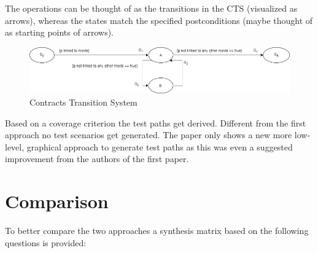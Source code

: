 The operations can be thought of as the transitions in the CTS (visualized as arrows), whereas the states match the specified postconditions (maybe thought of as starting points of arrows).

\begin{figure}[h]
	\centering
	\includegraphics[width=\textwidth]{./images/cts.png}
	\caption{Contracts Transition System}
	\label{cts}
\end{figure}

Based on a coverage criterion the test paths get derived. Different from the first approach no test scenarios get generated. The paper only shows a new more low-level, graphical approach to generate test paths as this was even a suggested improvement from the authors of the first paper. 

\section{Comparison} \label{comparison}

To better compare the two approaches a synthesis matrix based on the following questions is provided:

